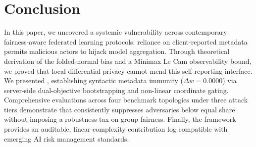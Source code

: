 \section{Conclusion}
\label{sec:conclusion}

In this paper, we uncovered a systemic vulnerability across contemporary fairness-aware federated learning protocols: reliance on client-reported metadata permits malicious actors to hijack model aggregation. Through theoretical derivation of the folded-normal bias and a Minimax Le Cam observability bound, we proved that local differential privacy cannot mend this self-reporting interface. We presented \MethodName{}, establishing syntactic metadata immunity ($\Delta w = 0.0000$) via server-side dual-objective bootstrapping and non-linear coordinate gating. Comprehensive evaluations across four benchmark topologies under three attack tiers demonstrate that \MethodName{} consistently suppresses adversaries below equal share without imposing a robustness tax on group fairness. Finally, the framework provides an auditable, linear-complexity contribution log compatible with emerging AI risk management standards.
